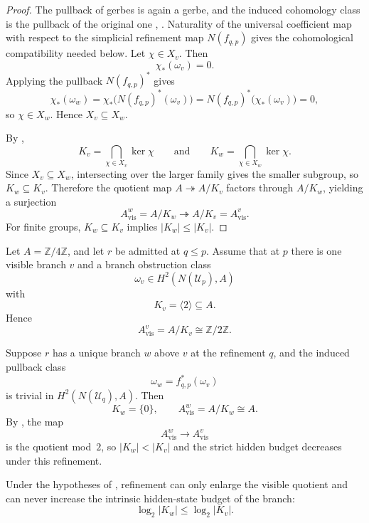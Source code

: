 \begin{proof}
The pullback of gerbes is again a gerbe, and the induced cohomology class is the pullback of the original one \cite[Tag 06NY]{StacksProject}, \cite[Theorem~3.11]{BerghSchnurer2021}. Naturality of the universal coefficient map with respect to the simplicial refinement map $N(f_{q,p})$ gives the cohomological compatibility needed below. Let $\chi\in X_v$. Then
\[
\chi_*(\omega_v)=0.
\]
Applying the pullback $N(f_{q,p})^*$ gives
\[
\chi_*(\omega_w)=\chi_*\bigl(N(f_{q,p})^*(\omega_v)\bigr)=N(f_{q,p})^*\bigl(\chi_*(\omega_v)\bigr)=0,
\]
so $\chi\in X_w$. Hence $X_v\subseteq X_w$.

By ,
\[
K_v=\bigcap_{\chi\in X_v}\ker\chi
\qquad\text{and}\qquad
K_w=\bigcap_{\chi\in X_w}\ker\chi.
\]
Since $X_v\subseteq X_w$, intersecting over the larger family gives the smaller subgroup, so $K_w\subseteq K_v$. Therefore the quotient map $A\twoheadrightarrow A/K_v$ factors through $A/K_w$, yielding a surjection
\[
A_{\mathrm{vis}}^w=A/K_w\twoheadrightarrow A/K_v=A_{\mathrm{vis}}^v.
\]
For finite groups, $K_w\subseteq K_v$ implies $|K_w|\le |K_v|$.
\end{proof}

\begin{example}\label{ex:refinement-drop}
Let $A=\mathbb Z/4\mathbb Z$, and let $r$ be admitted at $q\le p$.
Assume that at $p$ there is one visible branch $v$ and a branch obstruction class
\[
\omega_v\in H^2(N(\mathcal U_p),A)
\]
with
\[
K_v=\langle 2\rangle\subseteq A.
\]
Hence
\[
A_{\mathrm{vis}}^v=A/K_v\cong \mathbb Z/2\mathbb Z.
\]

Suppose $r$ has a unique branch $w$ above $v$ at the refinement $q$, and the induced pullback class
\[
\omega_w=f_{q,p}^*(\omega_v)
\]
is trivial in $H^2(N(\mathcal U_q),A)$. Then
\[
K_w=\{0\},\qquad A_{\mathrm{vis}}^w=A/K_w\cong A.
\]
By , the map
\[
A_{\mathrm{vis}}^w\longrightarrow A_{\mathrm{vis}}^v
\]
is the quotient mod~$2$, so $|K_w|<|K_v|$ and the strict hidden budget decreases under this refinement.
\end{example}

\begin{corollary}\label{cor:branch-budget-monotonicity}
Under the hypotheses of , refinement can only enlarge the visible quotient and can never increase the intrinsic hidden-state budget of the branch:
\[
\log_2|K_w|\le \log_2|K_v|.
\]
\end{corollary}

